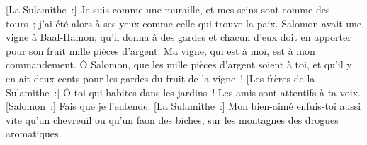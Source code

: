 \begin{multicols}{2}
[La Sulamithe~:] Je suis comme une muraille, et mes seins sont comme des tours~; j'ai été alors à ses yeux comme celle qui trouve la paix. 
Salomon avait une vigne à Baal-Hamon, qu'il donna à des gardes et chacun d'eux doit en apporter pour son fruit mille pièces d'argent. 
Ma vigne, qui est à moi, est à mon commandement. Ô Salomon, que les mille pièces d'argent soient à toi, et qu'il y en ait deux cents pour les gardes du fruit de la vigne~!
[Les frères de la Sulamithe~:] Ô toi qui habites dans les jardins~! Les amis sont attentifs à ta voix. [Salomon~:] Fais que je l'entende. 
[La Sulamithe~:] Mon bien-aimé enfuis-toi aussi vite qu'un chevreuil ou qu'un faon des biches, sur les montagnes des drogues aromatiques. 
\PPE{}
\end{multicols}
